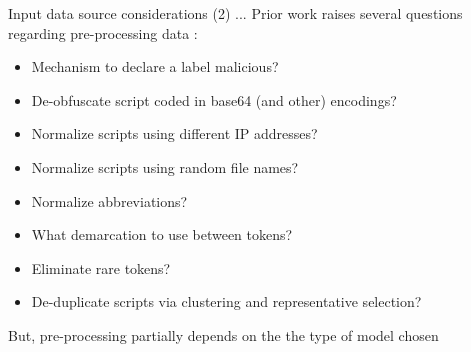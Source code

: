\documentclass[10pt]{beamer}
\begin{document}
\begin{frame}{Input data source considerations (2) ...}
	Prior work raises several questions regarding pre-processing data \cite{powershell2018,amsi2019,feye2018}:
	\begin{itemize}
		\item Mechanism to declare a label malicious?
		\item De-obfuscate script coded in base64 (and other) encodings?
		\item Normalize scripts using different IP addresses?
		\item Normalize scripts using random file names?
		\item Normalize abbreviations?
		\item What demarcation to use between tokens?
		\item Eliminate rare tokens?
		\item De-duplicate scripts via clustering and representative selection?
	\end{itemize}
	But, pre-processing partially depends on the the type of model chosen
\end{frame}
\end{document}
